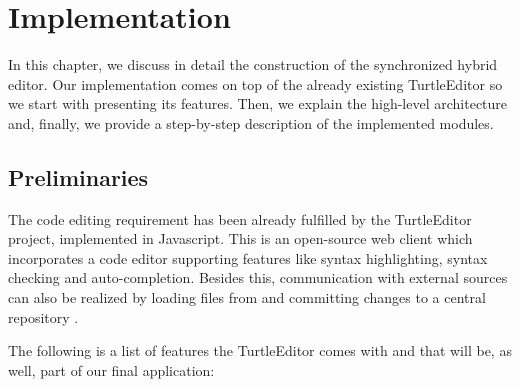 \chapter{Implementation}
\label{ch:implementation}

In this chapter, we discuss in detail the construction of the synchronized hybrid editor. Our implementation comes on top of the already existing TurtleEditor \cite{Petersen2016} so we start with presenting its features. Then, we explain the high-level architecture and, finally, we provide a step-by-step description of the implemented modules.


\section {Preliminaries}
\label{sec:preliminaries}

The code editing requirement has been already fulfilled by the TurtleEditor project, implemented in Javascript. This is an open-source web client which incorporates a code editor supporting features like syntax highlighting, syntax checking and auto-completion. Besides this, communication with external sources can also be realized by loading files from and committing changes to a central repository \cite{Petersen2016}.

The following is a list of features the TurtleEditor comes with and that will be, as well, part of our final application:


